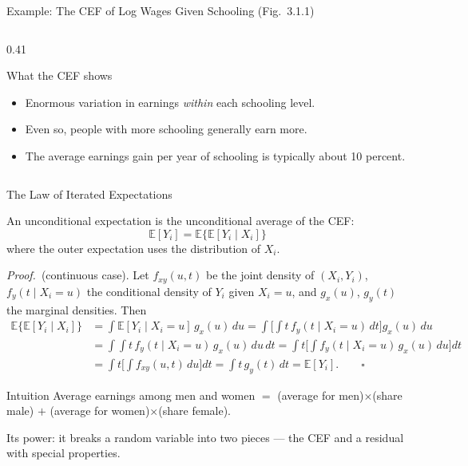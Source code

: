 \documentclass[aspectratio=169,11pt]{beamer}
\newcommand{\E}{\mathbb{E}}
\newcommand{\PrfLbl}{\textcolor{DeepBlue}{\textit{Proof.}}\ }
\begin{document}
\begin{frame}{Example: The CEF of Log Wages Given Schooling (Fig.\ 3.1.1)}
\begin{columns}[T]
\begin{column}{0.41\textwidth}
\medskip

\begin{block}{What the CEF shows}
\begin{itemize}
    \item Enormous variation in earnings \emph{within} each schooling level.
    \item Even so, people with more schooling generally earn more.
    \item The average earnings gain per year of schooling is typically
    about \alert{10 percent}.
\end{itemize}
\end{block}
\end{column}
\end{columns}

\end{frame}


\begin{frame}{The Law of Iterated Expectations}
\small

An unconditional expectation is the unconditional average of the CEF:
\[
\boxed{\E[Y_i] = \E\{\E[Y_i\mid X_i]\}}
\tag{3.1.1}
\]
where the outer expectation uses the distribution of $X_i$.

\PrfLbl (continuous case). Let $f_{xy}(u,t)$ be the joint density of
$(X_i,Y_i)$, $f_y(t\mid X_i=u)$ the conditional density of $Y_i$ given
$X_i=u$, and $g_x(u)$, $g_y(t)$ the marginal densities. Then
\[
\begin{aligned}
\E\{\E[Y_i\mid X_i]\}
&= \int \E[Y_i\mid X_i=u]\,g_x(u)\,du
 = \int\Big[\int t\,f_y(t\mid X_i=u)\,dt\Big]g_x(u)\,du \\
&= \int\!\!\int t\,f_y(t\mid X_i=u)\,g_x(u)\,du\,dt
 = \int t\Big[\int f_y(t\mid X_i=u)\,g_x(u)\,du\Big]dt \\
&= \int t\Big[\int f_{xy}(u,t)\,du\Big]dt
 = \int t\,g_y(t)\,dt = \E[Y_i]. \qquad\square
\end{aligned}
\]

\begin{block}{Intuition}
Average earnings among men and women $=$ (average for men)$\times$(share male)
$+$ (average for women)$\times$(share female).
\end{block}

\medskip
Its power: it breaks a random variable into two pieces --- the CEF and a
residual with special properties.

\end{frame}
\end{document}
